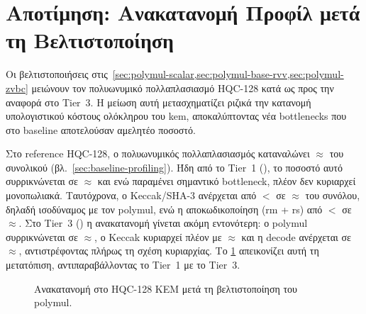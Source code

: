 \section{Αποτίμηση: Ανακατανομή Προφίλ μετά τη Βελτιστοποίηση}
\label{sec:polymul-assessment}

Οι βελτιστοποιήσεις στις~\cref{sec:polymul-scalar,sec:polymul-base-rvv,sec:polymul-zvbc}
μειώνουν τον πολυωνυμικό πολλαπλασιασμό HQC-128 κατά  ως
προς την αναφορά  στο Tier~3. Η μείωση αυτή μετασχηματίζει ριζικά 
την κατανομή υπολογιστικού κόστους ολόκληρου του \gls{kem}, αποκαλύπτοντας νέα 
bottlenecks που στο baseline αποτελούσαν αμελητέο ποσοστό.

Στο reference HQC-128, ο πολυωνυμικός πολλαπλασιασμός καταναλώνει
$\approx$ του συνολικού \instret (βλ.~\cref{sec:baseline-profiling}).
Ήδη από το Tier~1 (), το ποσοστό αυτό συρρικνώνεται σε
$\approx$ και ενώ παραμένει σημαντικό bottleneck, πλέον δεν κυριαρχεί
μονοπωλιακά. Ταυτόχρονα, ο Keccak/SHA-3 ανέρχεται από $<$ σε $\approx$ 
του συνόλου, δηλαδή ισοδύναμος με τον polymul, ενώ η αποκωδικοποίηση
(\gls{rm} + \gls{rs}) από $<$ σε $\approx$.
Στο Tier~3 () η ανακατανομή γίνεται ακόμη εντονότερη:
ο polymul συρρικνώνεται σε $\approx$, ο Keccak κυριαρχεί πλέον
με $\approx$ και η decode ανέρχεται σε $\approx$,
αντιστρέφοντας πλήρως τη σχέση κυριαρχίας. Το \cref{fig:pie-redistribution} 
απεικονίζει αυτή τη μετατόπιση, αντιπαραβάλλοντας το Tier~1 με το Tier~3.

\begin{figure}[htbp]
  \centering
  \caption[Ανακατανομή instret μετά βελτιστοποίηση polymul]{Ανακατανομή \instret στο HQC-128 KEM μετά τη βελτιστοποίηση του polymul.}
  \label{fig:pie-redistribution}
\end{figure}

